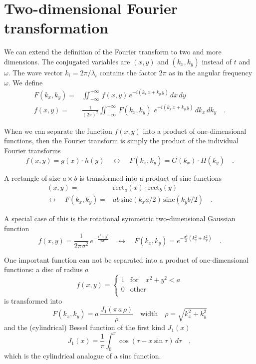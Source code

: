 \section{Two-dimensional Fourier transformation}

We can extend the definition of the Fourier transform to two and more dimensions. The conjugated variables are $(x,y)$ and $(k_x, k_y)$ instead of $t$ and $\omega$. The wave vector $k_i = 2\pi / \lambda_i$ contains the factor $2\pi$ as in the angular frequency $\omega$. We define
\begin{align}
  F(k_x, k_y) = & \iint_{-\infty}^{+\infty} \, f(x,y) \, e^{- i (k_x \, x + k_y \, y )} \, dx \, dy \\
  f(x,y) = & \frac{1}{(2 \pi )^2} \iint_{-\infty}^{+\infty} \, F(k_x, k_y) \,\, e^{+ i (k_x \, x + k_y \, y )}  \, dk_x \,dk_y \quad .
 \end{align}

When we can separate the function $f(x,y)$ into a product of one-dimensional functions, then  the Fourier transform is simply the product of the individual Fourier transforms
\begin{equation}
  f(x,y) = g(x) \cdot h(y) \quad \leftrightarrow \quad 
  F(k_x, k_y) = G(k_x) \cdot H(k_y) \quad .
\end{equation}

A rectangle of size $a \times b$ is transformed into a product of sinc functions
\begin{align}
  (x,y) = & \text{rect} _a (x) \cdot \text{rect} _b (y) \\
  \leftrightarrow \quad  F(k_x, k_y) = & a b \, \text{sinc}( k_x a /2) \, \text{sinc}( k_y b /2) \quad .
\end{align}


A special case of this is the rotational symmetric two-dimensional Gaussian function
\begin{equation}
  f(x,y) = 
  \frac{1}{2 \pi \sigma^2} \, e^{-  \frac{x^2 + y^2}{2 \sigma^2} }
  \quad \leftrightarrow \quad 
  F(k_x, k_y) = e^{- \frac{\sigma^2 }{2} \left(k_x^2 + k_y^2 \right)  } \quad .
\end{equation}

One important function can not be separated into a product of one-dimensional functions: a disc of radius $a$
    \begin{equation}
    f(x,y)  = \left\{ 
    \begin{array}{ll}
    1 & \text{for} \quad x^2+y^2 < a \\
    0 & \text{other} \\
    \end{array}
    \right.
   \end{equation}
is transformed into 
\begin{equation}
  F(k_x, k_y) = a \, \frac{J_1(\pi \, a \, \rho )}{\rho}
  \quad \text{width} \quad \rho = \sqrt{k_x^2 + k_y^2}
\end{equation}
and the (cylindrical) Bessel function of the first kind $J_1(x)$
\begin{equation}
  J_1(x) = \frac{1}{\pi} \int_0^\pi \cos (\tau - x \sin \tau) \,d\tau \quad ,
\end{equation}
which is the cylindrical analogue of a sinc function.



